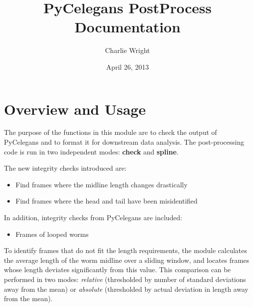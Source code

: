 \documentclass[letterpaper,10pt,openany,oneside]{sphinxmanual}
\title{PyCelegans PostProcess Documentation}
\date{April 26, 2013}
\author{Charlie Wright}
\begin{document}
\maketitle
\tableofcontents
{}\label{index::doc}



\chapter{Overview and Usage}
\label{index:overview-and-usage}\label{index:pycelegans-postprocess-documentation}
The purpose of the functions in this module are to check the output of
PyCelegans and to format it for downstream data analysis. The post-processing
code is run in two independent modes: \textbf{check} and \textbf{spline}.


The new integrity checks introduced are:
\begin{itemize}
\item {} 
Find frames where the midline length changes drastically

\item {} 
Find frames where the head and tail have been misidentified

\end{itemize}

In addition, integrity checks from PyCelegans are included:
\begin{itemize}
\item {} 
Frames of looped worms

\end{itemize}

To identify frames that do not fit the length requirements, the  module calculates the average length of the worm midline over a sliding window, and locates frames whose length deviates significantly from this value. This comparison can be performed in two modes: \emph{relative} (thresholded by number of standard deviations away from the mean) or \emph{absolute} (thresholded by actual deviation in length away from the mean).
\end{document}
